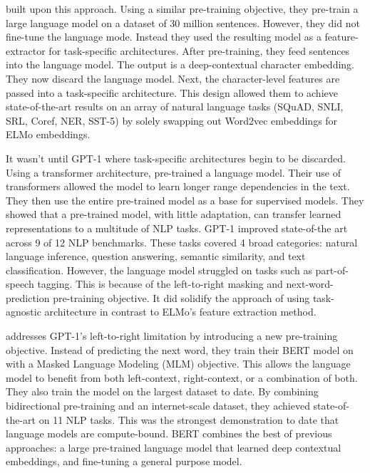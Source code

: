 \documentclass[11pt,a4paper,titlepage]{article}
\begin{document}
\cite{peters2018deep} built upon this approach. Using a similar pre-training objective, they pre-train a large language model on a dataset of 30 million sentences. However, they did not fine-tune the language mode. Instead they used the resulting model as a feature-extractor for task-specific architectures. After pre-training, they feed sentences into the language model. The output is a deep-contextual character embedding. They now discard the language model. Next, the character-level features are passed into a task-specific architecture. This design allowed them to achieve state-of-the-art results on an array of natural language tasks (SQuAD, SNLI, SRL, Coref, NER, SST-5) by solely swapping out Word2vec embeddings for ELMo embeddings.

It wasn’t until GPT-1 where task-specific architectures begin to be discarded. Using a transformer architecture, \cite{radford2018improving} pre-trained a language model. Their use of transformers allowed the model to learn longer range dependencies in the text. They then use the entire pre-trained model as a base for supervised models. They showed that a pre-trained model, with little adaptation, can transfer learned representations to a multitude of NLP tasks. GPT-1 improved state-of-the art across 9 of 12 NLP benchmarks. These tasks covered 4 broad categories: natural language inference, question answering, semantic similarity, and text classification. However, the language model struggled on tasks such as part-of-speech tagging. This is because of the left-to-right masking and next-word-prediction pre-training objective. It did solidify the approach of using task-agnostic architecture in contrast to ELMo’s feature extraction method.

\cite{DBLP:journals/corr/abs-1810-04805} addresses GPT-1’s left-to-right limitation by introducing a new pre-training objective. Instead of predicting the next word, they train their BERT model on with a Masked Language Modeling (MLM) objective. This allows the language model to benefit from both left-context, right-context, or a combination of both. They also train the model on the largest dataset to date. By combining bidirectional pre-training and an internet-scale dataset, they achieved state-of-the-art on 11 NLP tasks. This was the strongest demonstration to date that language models are compute-bound. BERT combines the best of previous approaches: a large pre-trained language model that learned deep contextual embeddings, and fine-tuning a general purpose model.
\end{document}
